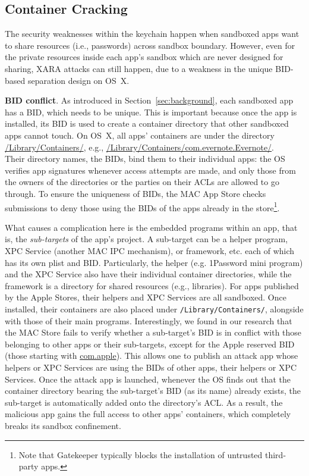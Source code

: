 \documentclass{article}
\begin{document}
\subsection{Container Cracking}
\label{subsec:bundleid}




The security weaknesses within the keychain happen when sandboxed apps want to share resources (i.e., passwords) across sandbox boundary. However, even for the private resources inside each app's sandbox which are never designed for sharing, XARA attacks can still happen, due to a weakness in the unique BID-based separation design on OS~X.

\vspace {3pt}\noindent\textbf{BID conflict}. As introduced in Section~\ref{sec:background}, each sandboxed app has a BID, which needs to be unique.  This is important because once the app is installed, its BID is used to create a container directory that other sandboxed apps cannot touch. On OS~X, all apps' containers are under the directory \url{/Library/Containers/}, e.g., \url{/Library/Containers/com.evernote.Evernote/}.  \\Their directory names, the BIDs, bind them to their individual apps: the OS verifies app signatures whenever access attempts are made, and only those from the owners of the directories or the parties on their ACLs are allowed to go through.  To ensure the uniqueness of BIDs, the MAC App Store checks submissions to deny those using the BIDs of the apps already in the store\footnote{\small Note that Gatekeeper typically blocks the installation of untrusted third-party apps.}.

What causes a complication here is the embedded programs within an app, that is, the \textit{sub-targets} of the app's project. A sub-target can be a helper program, XPC Service (another MAC IPC mechanism), or framework, etc. each of which has its own plist and BID. Particularly, the helper (e.g. 1Password mini program) and the XPC Service also have their individual container directories, while the framework is a directory for shared resources (e.g., libraries). For apps published by the Apple Stores, their helpers and XPC Services are all sandboxed. Once installed, their containers are also placed under \texttt{/Library/Containers/}, alongside with those of their main programs. Interestingly, we found in our research that the MAC Store fails to verify whether a sub-target's BID is in conflict with those belonging to other apps or their sub-targets, except for the Apple reserved BID (those starting with \url{com.apple}). This allows one to publish an attack app whose helpers or XPC Services are using the BIDs of other apps, their helpers or XPC Services.  Once the attack app is launched, whenever the OS finds out that the container directory bearing the sub-target's BID (as its name) already exists, the sub-target is automatically added onto the directory's ACL.  As a result, the malicious app gains the full access to other apps' containers, which completely breaks its sandbox confinement.
\end{document}
